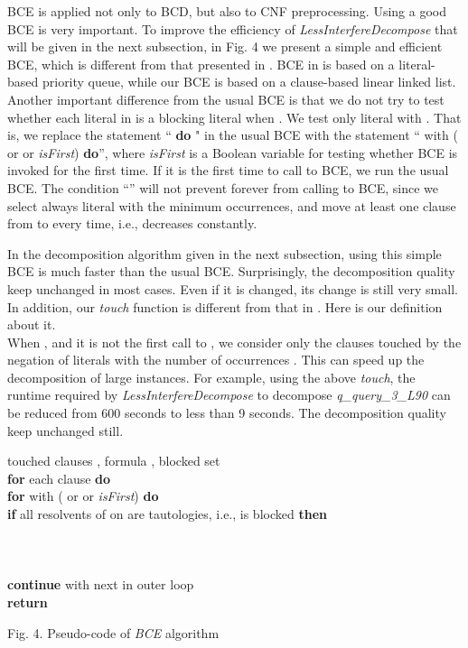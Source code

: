 \documentclass{llncs}
\begin{document}
BCE is applied not only to BCD, but also to CNF preprocessing. Using
a good BCE is very important.  To improve the efficiency of
\emph{LessInterfereDecompose} that will be given in the next
subsection, in Fig. 4 we present a simple and efficient BCE, which
is different from that presented in \cite{BCE:12}. BCE in
\cite{BCE:12} is based on a literal-based priority queue, while our
BCE is based on a clause-based linear linked list. Another important
difference from the usual BCE is that we do not try to test whether
each literal  in  is a blocking literal when .
We test only literal  with . That is, we replace
the statement `` {   {\bf do} }" in the
usual BCE with the statement `` {  with
( or  or \emph{isFirst}) {\bf do}}'',
where \emph{isFirst} is a Boolean variable for testing whether BCE
is invoked for the first time. If it is the first time to call to
BCE, we run the usual BCE. The condition ``'' will
not prevent forever from calling to BCE, since we select always
literal  with the minimum occurrences, and move at least one
clause from  to  every time, i.e., 
decreases constantly.

 In the decomposition algorithm given in the next subsection, using this simple BCE is
much faster than the usual BCE. Surprisingly, the decomposition
quality keep unchanged in most cases. Even if it is changed, its
change is still very small. In addition, our \emph{ touch} function
is different from that in \cite{BCE:12}. Here is our definition
about it.
\\
When , and it is not the first call to , we
consider only the clauses touched by the negation of literals with
the number of occurrences . This can speed up the decomposition
of large instances. For example, using the above \emph{touch},  the
runtime required by \emph{LessInterfereDecompose} to decompose
\emph{q\_query\_3\_L90} can be reduced from 600 seconds to less than
9 seconds. The decomposition quality keep unchanged still.


\begin{flushleft}
\begin{sf}
\begin{footnotesize}

\hskip 12mm touched clauses , formula , blocked set \\
\hskip 16mm {\bf for } each clause  {\bf do}\\
\hskip 20mm    {\bf for }   with ( or  or \emph{isFirst}) {\bf do}\\
\hskip 24mm    {\bf if } all resolvents of  on  are tautologies, i.e.,  is blocked {\bf then}\\
\hskip 28mm \\
\hskip 28mm \\
\hskip 28mm \\
\hskip 28mm {\bf continue} with next  in outer loop\\
\hskip 16mm {\bf return} 

\vspace{1em}
\hskip 8mm \textrm{Fig. 4. Pseudo-code of \emph{BCE}
algorithm}
\end{footnotesize}
\end{sf}
\end{flushleft}
\end{document}
